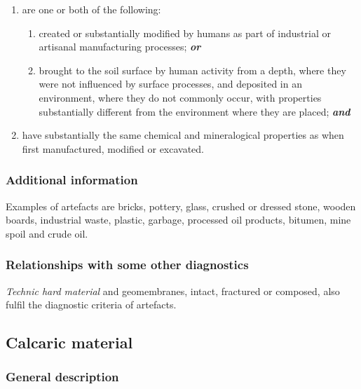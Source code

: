 \documentclass[
  letterpaper,
  DIV=11,
  numbers=noendperiod]{scrreprt}
\providecommand{\tightlist}{%
  \setlength{\itemsep}{0pt}\setlength{\parskip}{0pt}}\usepackage{longtable,booktabs,array}
\begin{document}
\begin{enumerate}
\def\labelenumi{\arabic{enumi}.}
\tightlist
\item
  are one or both of the following:

  \begin{enumerate}
  \def\labelenumii{\alph{enumii}.}
  \tightlist
  \item
    created or substantially modified by humans as part of industrial or
    artisanal manufacturing processes; \textbf{\emph{or}}
  \item
    brought to the soil surface by human activity from a depth, where
    they were not influenced by surface processes, and deposited in an
    environment, where they do not commonly occur, with properties
    substantially different from the environment where they are placed;
    \textbf{\emph{and}}
  \end{enumerate}
\item
  have substantially the same chemical and mineralogical properties as
  when first manufactured, modified or excavated.
\end{enumerate}

\hypertarget{additional-information-29}{%
\subsubsection{Additional information}\label{additional-information-29}}

Examples of artefacts are bricks, pottery, glass, crushed or dressed
stone, wooden boards, industrial waste, plastic, garbage, processed oil
products, bitumen, mine spoil and crude oil.

\hypertarget{relationships-with-some-other-diagnostics-52}{%
\subsubsection{Relationships with some other
diagnostics}\label{relationships-with-some-other-diagnostics-52}}

\emph{Technic hard material} and geomembranes, intact, fractured or
composed, also fulfil the diagnostic criteria of artefacts.

\hypertarget{calcaric-material}{%
\subsection{Calcaric material}\label{calcaric-material}}

\hypertarget{general-description-57}{%
\subsubsection{General description}\label{general-description-57}}
\end{document}
